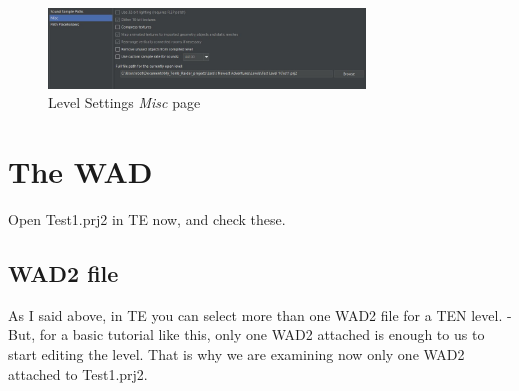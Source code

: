  \begin{figure}
    \centering
     \includegraphics[width=0.75\textwidth]{screenshots/24.jpg}
     \caption{Level Settings \emph{Misc} page}
     \label{fig:TElevelsettingsMisc}
\end{figure}

\chapter{The WAD}

Open Test1.prj2 in TE now, and check these.

\section{WAD2 file}
As I said above, in TE you can select more than one WAD2 file for a TEN level. - But, for a basic tutorial like this, only one WAD2 attached is enough to us to start editing the level. That is why we are examining now only one WAD2 attached to Test1.prj2.




